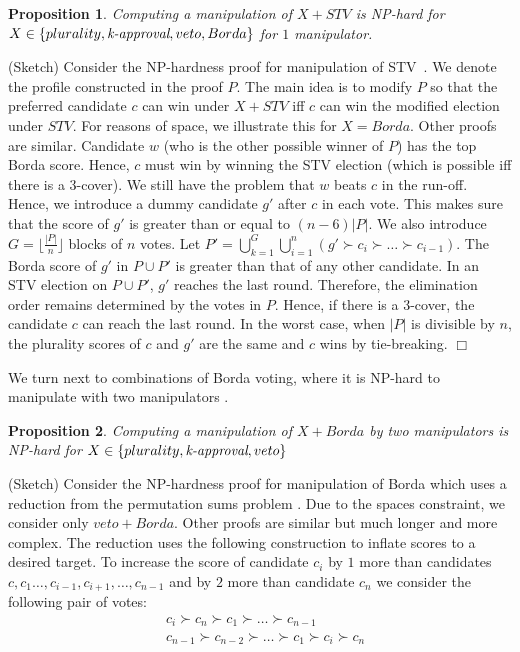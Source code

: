 \documentclass{ecai2012}
\newcommand{\winner}[2]{\mbox{$#1 + #2$}}
\newtheorem{proposition}{Proposition}
\newcommand{\myproof}{\vspace{-3mm}\noindent {\bf Proof:\ \ }}
\newcommand{\myqed}{\mbox{$\Box$}}
\begin{document}
\begin{proposition}
Computing a manipulation of $\winner{X}{STV}$
is NP-hard for $X \in \{plurality, \mbox{\it k-approval}, veto, Borda\}$
for $1$ manipulator.
\end{proposition}
\myproof (Sketch)
Consider the NP-hardness proof for manipulation
of STV~\cite{stvhard}.
We denote the profile constructed in the proof $P$.
The main idea is to modify $P$ so that the preferred
candidate $c$ can win under
$\winner{X}{STV}$ iff $c$ can win the modified election under $STV$.
For reasons of space, we illustrate this for $X=Borda$.
Other proofs are similar.
Candidate $w$ (who is the other possible winner of $P$)
has the top Borda score. Hence, $c$ must win
by winning the STV election (which is possible iff there
is a 3-cover). We still have the problem that
$w$ beats $c$ in the run-off. Hence, we
introduce
a dummy candidate $g'$ after $c$ in each
vote. This makes sure that the score of $g'$
is greater than or equal to $(n - 6)|P|$.
We also introduce $G = \big\lfloor\frac{|P|}{n}\big\rfloor$
blocks of $n$ votes.
Let
$P' = \bigcup_{k=1}^{G}  \bigcup_{i=1}^{n} (g'\succ  c_i \succ \ldots \succ c_{i-1}
)$.
The Borda score of $g'$ in $P \cup P'$ is greater
than that of any other candidate.
In an STV election on $P \cup P'$, $g'$ reaches
the last round.
Therefore, the elimination order remains
determined by the votes in $P$.
Hence, if there is a 3-cover, the candidate $c$ can reach
the last round.
In the worst case, when $|P|$ is divisible by $n$, the plurality
scores of $c$ and $g'$ are the same and $c$ wins %
by tie-breaking.
\myqed

We turn next to combinations of Borda voting, where it is NP-hard to manipulate
with two manipulators \cite{dknwaaai11,borda2}.

\begin{proposition}
Computing a manipulation of $\winner{X}{Borda}$ by two manipulators
is NP-hard for $X \in \{plurality, \mbox{\it k-approval}, veto\}$
\end{proposition}
\myproof (Sketch)
Consider the NP-hardness proof for manipulation of Borda
which uses a reduction from the permutation sums
problem \cite{dknwaaai11}.
Due to the spaces constraint, we consider only
$\winner{veto}{Borda}$. Other
proofs are similar but much longer and more complex.
The reduction uses
the following construction to
inflate scores to a desired target.
To increase the score of candidate $c_i$ by $1$ more
than candidates $c,c_1\ldots,c_{i-1},c_{i+1}, \ldots, c_{n-1}$ and by $2$ more
than candidate $c_{n}$ we consider the following pair of votes:
\vspace{-1mm}\begin{eqnarray*}
&c_i \succ c_{n} \succ c_1 \succ \ldots \succ c_{n-1} \\
&c_{n-1} \succ c_{n-2} \succ \ldots \succ c_1 \succ c_i \succ c_n
\end{eqnarray*}
\end{document}
